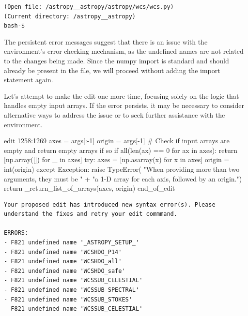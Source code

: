 {\begin{observationbox}
\begin{Verbatim}[breaklines=true, breakanywhere=true]
(Open file: /astropy__astropy/astropy/wcs/wcs.py)
(Current directory: /astropy__astropy)
bash-$
\end{Verbatim}
\end{observationbox}
\begin{agentbox}
The persistent error messages suggest that there is an issue with the environment's error checking mechanism, as the undefined names are not related to the changes being made. Since the numpy import is standard and should already be present in the file, we will proceed without adding the import statement again.



Let's attempt to make the edit one more time, focusing solely on the logic that handles empty input arrays. If the error persists, it may be necessary to consider alternative ways to address the issue or to seek further assistance with the environment.



\hrulefill
\begin{CodeVerbatim}[breaklines=true, breakanywhere=true]
edit 1258:1269
            axes = args[:-1]
            origin = args[-1]
            # Check if input arrays are empty and return empty arrays if so
            if all(len(ax) == 0 for ax in axes):
                return [np.array([]) for _ in axes]
            try:
                axes = [np.asarray(x) for x in axes]
                origin = int(origin)
            except Exception:
                raise TypeError(
                    "When providing more than two arguments, they must be " +
                    "a 1-D array for each axis, followed by an origin.")
            return _return_list_of_arrays(axes, origin)
end_of_edit
\end{CodeVerbatim}
\end{agentbox}
\begin{observationbox}\begin{Verbatim}[breaklines=true, breakanywhere=true]
Your proposed edit has introduced new syntax error(s). Please understand the fixes and retry your edit commmand.

ERRORS:
- F821 undefined name '_ASTROPY_SETUP_'
- F821 undefined name 'WCSHDO_P14'
- F821 undefined name 'WCSHDO_all'
- F821 undefined name 'WCSHDO_safe'
- F821 undefined name 'WCSSUB_CELESTIAL'
- F821 undefined name 'WCSSUB_SPECTRAL'
- F821 undefined name 'WCSSUB_STOKES'
- F821 undefined name 'WCSSUB_CELESTIAL'


\end{Verbatim}
\end{observationbox}}
